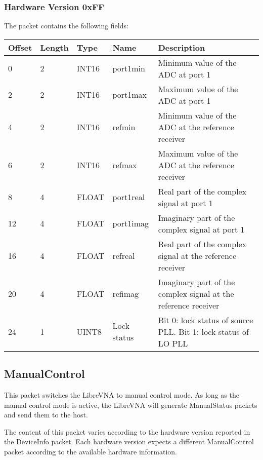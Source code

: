 \documentclass[a4paper,11pt]{article}
\begin{document}
\subsubsection{Hardware Version 0xFF}
The packet contains the following fields:
\begin{ThreePartTable}
\setlength\tabcolsep{3pt}

\begin{longtable}{p{} |  p{}  |  p{}| p{} | p{}}
\toprule
\textbf{Offset} &\textbf{Length} &\textbf{Type} & \textbf{Name} &\textbf{Description} \\ 
\hline
\endhead
\midrule[\heavyrulewidth]
\endfoot  
\midrule[\heavyrulewidth]
\endlastfoot

0 & 2 & INT16 & port1min & Minimum value of the ADC at port 1 \\
2 & 2 & INT16 & port1max & Maximum value of the ADC at port 1 \\
4 & 2 & INT16 & refmin & Minimum value of the ADC at the reference receiver \\
6 & 2 & INT16 & refmax & Maximum value of the ADC at the reference receiver \\
8 & 4 & FLOAT & port1real & Real part of the complex signal at port 1 \\
12 & 4 & FLOAT & port1imag & Imaginary part of the complex signal at port 1 \\
16 & 4 & FLOAT & refreal & Real part of the complex signal at the reference receiver \\
20 & 4 & FLOAT & refimag & Imaginary part of the complex signal at the reference receiver \\
24 & 1 & UINT8 & Lock status & Bit 0: lock status of source PLL. Bit 1: lock status of LO PLL \\
\end{longtable}   
\end{ThreePartTable}

\subsection{ManualControl}
This packet switches the LibreVNA to manual control mode. As long as the manual control mode is active, the LibreVNA will generate ManualStatus packets and send them to the host.

The content of this packet varies according to the hardware version reported in the DeviceInfo packet. Each hardware version expects a different ManualControl packet according to the available hardware information.
\end{document}
